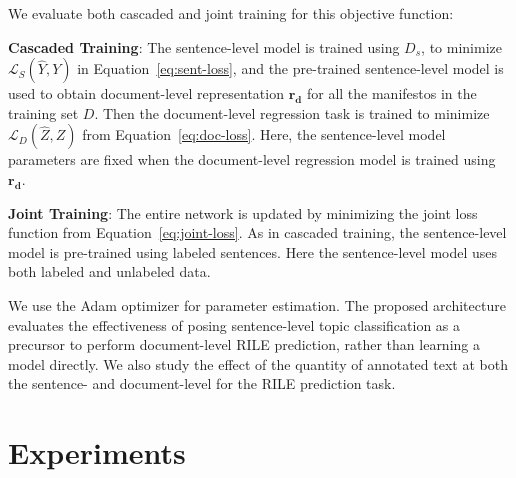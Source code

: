 \documentclass[11pt,a4paper]{article}
\newcommand{\eqnref}[2][]{Equation#1~\ref{#2}\xspace}
\begin{document}
We evaluate both cascaded and joint training for this objective function:
\begin{description}
\item{\textbf{Cascaded Training}:} The sentence-level model is trained using $D_{s}$, to minimize $\mathcal{L}_S(\hat{Y},Y)$ in \eqnref{eq:sent-loss}, and the pre-trained sentence-level model is used to obtain document-level representation $\mathbf{r_{d}}$ for all the manifestos in the training set $D$. Then the document-level regression task is trained to minimize $\mathcal{L}_D(\hat{Z}, Z)$ from \eqnref{eq:doc-loss}. Here, the sentence-level model parameters are fixed when the document-level regression model is trained using $\mathbf{r_{d}}$.

\item{\textbf{Joint Training}:} The entire network is updated by minimizing the joint loss function from \eqnref{eq:joint-loss}. As in cascaded training, the sentence-level model is pre-trained using labeled sentences. Here the sentence-level model uses both labeled and unlabeled data.
\end{description}

We use the Adam optimizer \cite{DBLP:journals/corr/KingmaB14} for parameter estimation. The proposed architecture evaluates the effectiveness of posing sentence-level topic classification as a precursor to perform document-level RILE prediction, rather than learning a model directly.  We also study the effect of the quantity of annotated text at both the sentence- and document-level for the RILE prediction task. 



\section{Experiments}
\end{document}
